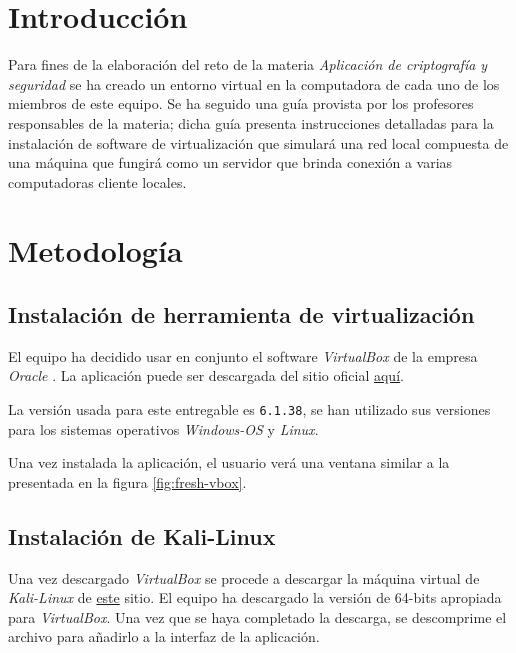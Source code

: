 \documentclass{article}
\begin{document}
    \tableofcontents
    \clearpage

    \section{Introducción}
        
        Para fines de la elaboración del reto de la materia \emph{Aplicación de criptografía y seguridad} se ha creado un entorno virtual en la computadora de cada uno de los miembros de este equipo. Se ha seguido una guía provista por los profesores responsables de la materia; dicha guía presenta instrucciones detalladas para la instalación de software de virtualización que simulará una red local compuesta de una máquina que fungirá como un servidor que brinda conexión a varias computadoras cliente locales.

    \section{Metodología}

        \subsection{Instalación de herramienta de virtualización}

            El equipo ha decidido usar en conjunto el software \emph{VirtualBox} de la empresa \emph{Oracle} \cite{vbox-doc}. La aplicación puede ser descargada del sitio oficial \href{https://www.virtualbox.org/wiki/Downloads}{aquí}.

            La versión usada para este entregable es \texttt{6.1.38}, se han utilizado sus versiones para los sistemas operativos \emph{Windows-OS} y \emph{Linux}.

            Una vez instalada la aplicación, el usuario verá una ventana similar a la presentada en la figura \ref{fig:fresh-vbox}.

        \subsection{Instalación de Kali-Linux} \label{sec:kali-install}

            Una vez descargado \emph{VirtualBox} se procede a descargar la máquina virtual de \emph{Kali-Linux} de \href{https://www.kali.org/get-kali/#kali-virtual-machines}{este} sitio. El equipo ha descargado la versión de 64-bits apropiada para \emph{VirtualBox}. Una vez que se haya completado la descarga, se descomprime el archivo para añadirlo a la interfaz de la aplicación.
\end{document}
